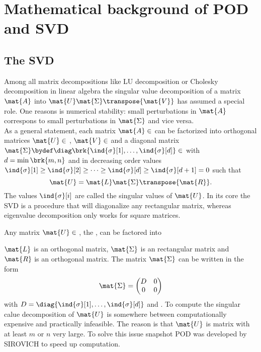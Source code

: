 \documentclass{scrartcl}
\begin{document}
\section{Mathematical background of POD and SVD}
	\subsection{The \acrshort{SVD}}

	Among all matrix decompositions like LU decomposition or Cholesky decomposition in linear algebra the singular value decomposition of a matrix $\mat{A}$ into $\mat{U}\mat{\Sigma}\transpose{\mat{V}}$ has assumed a special role. One reasons is numerical stability: small perturbations in $\mat{A}$ correspons to small perturbations in $\mat{\Sigma}$ and vice versa.  \\
	As a general statement, each matrix $\mat{A}\in$  can be factorized into orthogonal matrices $\mat{U}\in$ , $\mat{V}\in$  and a diagonal matrix $\mat{\Sigma}\bydef\diag\brk{\ind{\sigma}[1],\dots,\ind{\sigma}[d]}\in$ 
	with $d=\min\brk{m,n}$ and in decreasing order values $\ind{\sigma}[1]\geq\ind{\sigma}[2]\geq\dots\geq\ind{\sigma}[d]\geq\ind{\sigma}[d+1]=0$ such that
	\begin{equation}
		\mat{U}=\mat{L}\mat{\Sigma}\transpose{\mat{R}}.
	\end{equation}
	The values $\ind{\sigma}[i]$ are called the singular values of $\mat{U}$.
	In its core the SVD is a procedure that will diagonalize any rectangular matrix, whereas eigenvalue decomposition only works for square matrices.






\newpage

	Any matrix $\mat{U}\in$ , the , can be factored into

	$\mat{L}$ is an  orthogonal matrix, $\mat{\Sigma}$ is an  rectangular matrix and $\mat{R}$ is an  orthogonal matrix.
	The matrix $\mat{\Sigma}$ can be written in the form
	\begin{equation}
		\mat{\Sigma}=
			\begin{pmatrix}
			D & 0 \\
			0 & 0
			\end{pmatrix}
		\end{equation}
	with $D=\diag{\ind{\sigma}[1],\dots,\ind{\sigma}[d]}$ and .
	To compute the singular calue decomposition of $\mat{U}$ is somewhere between computationally expensive and practically infeasible. The reason is that $\mat{U}$ is  matrix with at least $m$ or $n$ very large. To solve this issue snapshot POD was developed by SIROVICH to speed up computation.
\end{document}
